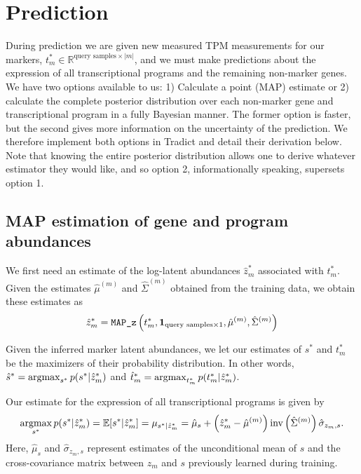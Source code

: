 \documentclass[10pt]{article}
\newcommand{\argmax}{\operatornamewithlimits{argmax}}
\begin{document}
\section{Prediction}

During prediction we are given new measured TPM measurements for our markers, $t^*_m \in \mathbb{R}^{\textrm{query samples} \times |m|} $, and we must make predictions about the expression of all transcriptional programs and the remaining non-marker genes. We have two options available to us: 1) Calculate a point (MAP) estimate or 2) calculate the complete posterior distribution over each non-marker gene and transcriptional program in a fully Bayesian manner. The former option is faster, but the second gives more information on the uncertainty of the prediction. We therefore implement both options in Tradict and detail their derivation below. Note that knowing the entire posterior distribution allows one to derive whatever estimator they would like, and so option 2, informationally speaking, supersets option 1. 

\subsection{MAP estimation of gene and program abundances}
We first need an estimate of the log-latent abundances $\hat{z}_m^*$ associated with $t^*_m $. Given the estimates $\hat{\mu}^{(m)}$ and $\hat{\Sigma}^{(m)} $ obtained from the training data, we obtain these estimates as 
\[
\hat{z}_m^* = \verb|MAP_z| \left(t_m^*, \textbf{1}_{\textrm{query samples} \times 1}, \hat{\mu}^{(m)}, \hat{\Sigma}^{(m)} \right)
\]



Given the inferred marker latent abundances, we let our estimates of $s^*$ and $t_m^*$ be the maximizers of their probability distribution. In other words, $\hat{s}^* = \argmax_{s^*} p(s^* | \hat{z}_m^*)$ and $\hat{t}_m^* = \argmax_{t_m^*} p(t_m^* | \hat{z}_m^*)$. 

Our estimate for the expression of all transcriptional programs is given by
\[
\argmax_{s^*} p(s^* | \hat{z}_m^*) = \mathbb{E}[s^* |\hat{z}_m^* ] = \mu_{s^* |\hat{z}_m^* } = \hat{\mu}_s + \left(\hat{z}_m^*  - \hat{\mu}^{(m)} \right)\textrm{inv}\left( \hat{\Sigma}^{(m)} \right)\hat{\sigma}_{z_{m},s}.
\]
Here, $\hat{\mu}_s $ and $\hat{\sigma}_{z_{m},s}$ represent estimates of the unconditional mean of $s$ and the cross-covariance matrix between $z_m$ and $s$ previously learned during training.
\end{document}

